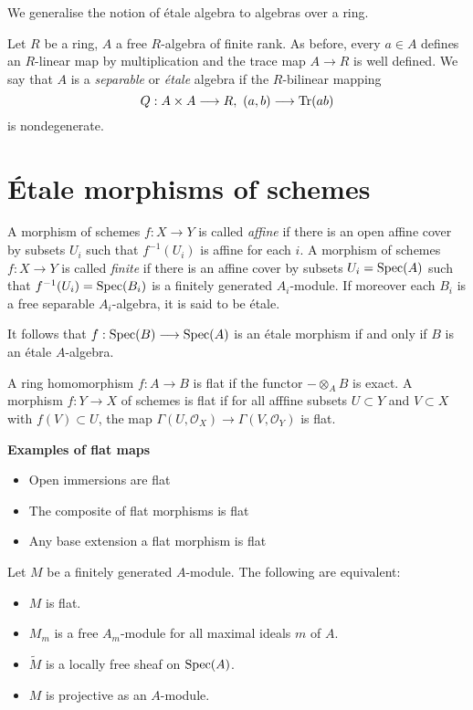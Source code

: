 We generalise the notion of \'etale algebra to algebras over a ring.

\begin{definition}
	Let $R$ be a ring, $A$ a free $R$-algebra of finite rank. As before, every $a \in A$ defines an $R$-linear map by multiplication and the trace map $A \to R$ is well defined. We say that $A$ is a \textit{separable} or \textit{\'etale} algebra if the $R$-bilinear mapping
	\[
		Q : A \times A \longrightarrow R,\ (a,b) \longrightarrow \operatorname{Tr}(ab)
	\]
	is nondegenerate.
\end{definition}

\section{\'Etale morphisms of schemes}
\begin{definition}
	A morphism of schemes $f: X \to Y$ is called \textit{affine} if there is an open affine cover by subsets $U_i$ such that $f^{-1}(U_i)$ is affine for each $i$. A morphism of schemes $f: X \to Y$ is called \textit{finite} if there is an affine cover by subsets $U_i = \operatorname{Spec}(A)$ such that $f^{-1}(U_i) = \operatorname{Spec}(B_i)$ is a finitely generated $A_i$-module. If moreover each $B_i$ is a free separable $A_i$-algebra, it is said to be \'etale.
\end{definition}
It follows that $f: \operatorname{Spec}(B) \longrightarrow \operatorname{Spec}(A)$ is an \'etale morphism if and only if $B$ is an \'etale $A$-algebra.

\begin{definition}\label{def:flatness}
	A ring homomorphism $f: A \to B$ is flat if the functor $- \otimes_A B$ is exact. A morphism $f: Y \to X$ of schemes is flat if for all afffine subsets $U \subset Y$ and $V \subset X$ with $f(V) \subset U$, the map $\Gamma(U, \mathcal{O}_X) \to \Gamma(V, \mathcal{O}_Y)$ is flat.
\end{definition}

\textbf{Examples of flat maps}
\begin{itemize}
	\item Open immersions are flat
	\item The composite of flat morphisms is flat
	\item Any base extension a flat morphism is flat
\end{itemize}

\begin{theorem}
	Let $M$ be a finitely generated $A$-module. The following are equivalent:
	\begin{itemize}
		\item $M$ is flat.
		\item $M_m$ is a free $A_m$-module for all maximal ideals $m$ of $A$.
		\item $\widetilde{M}$ is a locally free sheaf on $\operatorname{Spec}(A)$.
		\item $M$ is projective as an $A$-module.
	\end{itemize}
\end{theorem}

